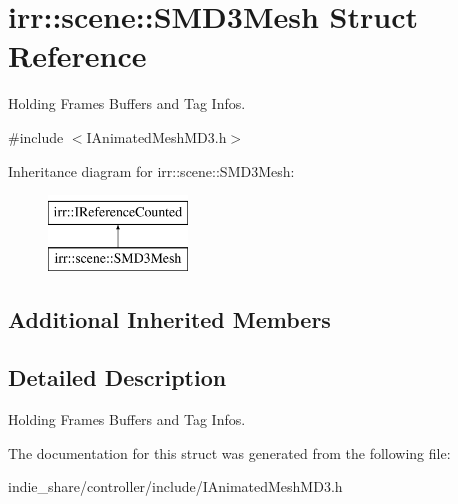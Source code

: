 \hypertarget{structirr_1_1scene_1_1SMD3Mesh}{}\section{irr\+:\+:scene\+:\+:S\+M\+D3\+Mesh Struct Reference}
\label{structirr_1_1scene_1_1SMD3Mesh}


Holding Frames Buffers and Tag Infos.  




{\ttfamily \#include $<$I\+Animated\+Mesh\+M\+D3.\+h$>$}

Inheritance diagram for irr\+:\+:scene\+:\+:S\+M\+D3\+Mesh\+:\begin{figure}[H]
\begin{center}
\leavevmode
\includegraphics[height=2.000000cm]{structirr_1_1scene_1_1SMD3Mesh}
\end{center}
\end{figure}
\subsection*{Additional Inherited Members}


\subsection{Detailed Description}
Holding Frames Buffers and Tag Infos. 

The documentation for this struct was generated from the following file\+:\begin{DoxyCompactItemize}
\item 
indie\+\_\+share/controller/include/I\+Animated\+Mesh\+M\+D3.\+h\end{DoxyCompactItemize}

